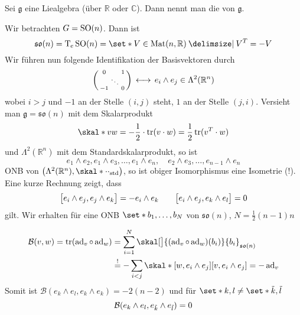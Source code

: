 \begin{definition}[{name=[Killingform]}]
	Sei $\mathfrak{g}$ eine Liealgebra (über $\mathbb{R}$ oder $\mathbb{C}$).
	Dann nennt man 
	die  von $\mathfrak{g}$.
\end{definition}

\begin{beispiel*}[{name=[spezielle orthogonale Gruppe]}]
	Wir betrachten $G=\SO(n)$.
	Dann ist 
	\[
		\mathfrak{so}(n) = \Tmap_e\SO(n) = \set*{V \in \Mat(n,\mathbb{R}) \given V^T=-V}
	\]
	Wir führen nun folgende Identifikation der Basisvektoren durch
	\[
		\begin{psmallmatrix}
			0 & & 1 \\
			& \ddots & \\
			-1 & & 0
		\end{psmallmatrix} \,\longleftrightarrow\, e_i \wedge e_j \in \Lambda^2(\mathbb{R}^n)
	\]
	wobei $i > j$ und $-1$ an der Stelle $(i,j)$ steht, $1$ an der Stelle $(j,i)$.
	Versieht man $\mathfrak{g} = \mathfrak{so}(n)$ mit dem Skalarprodukt
	\[
		\skal*{v}{w} = - \frac{1}{2}  \cdot \tr(v \cdot w) = \frac{1}{2} \tr(v^T \cdot w)
	\]
	und $\Lambda^2(\mathbb{R}^n)$ mit dem Standardskalarprodukt, so ist
	\[
		e_1 \wedge e_2, e_1 \wedge e_3, \ldots , e_1 \wedge e_n, \quad  e_2 \wedge e_3, \ldots , e_{n-1} \wedge e_n
	\]
	ONB von $\enbrace*{\Lambda^2(\mathbb{R}^n), \skal*{\cdot}{\cdot}_{\mathrm{std}}}$, so ist obiger Isomorphismus eine Isometrie (!).
	Eine kurze Rechnung zeigt, dass
	\[
		\benbrace[\big]{e_i \wedge e_j , e_j \wedge e_k} = - e_i \wedge e_k \qquad \benbrace[\big]{e_i \wedge e_j, e_k \wedge e_l}= 0
	\]
	gilt.
	Wir erhalten für eine ONB $\set*{b_1, \ldots ,b_N}$ von $\mathfrak{so}(n)$, $N=\frac{1}{2}(n-1)n$
\end{beispiel*}


\begin{align}
	\mathcal{B}(v,w) = \tr \enbrace*{\ad_v \circ \ad_w} &= \sum_{i=1}^{N} \skal[\big]{(\ad_v \circ \ad_w)(b_i)}{b_i}_{\mathfrak{so}(n)} \\
	&\stackrel{!}{=} -\sum_{i<j} \skal*{ \benbrace*{w,e_i \wedge e_j}}{ \benbrace*{v, e_i \wedge e_j}} = - \ad_v
\end{align}
Somit ist $\mathcal{B}(e_k \wedge e_l, e_k \wedge e_k)=-2(n-2)$ und für $\set*{k,l} \neq \set*{\tilde{k},\tilde{l}}$
\[
	\mathcal{B} \enbrace*{e_k \wedge e_l, e_{\tilde{k}} \wedge e_{\tilde{l}}} =0
\]

